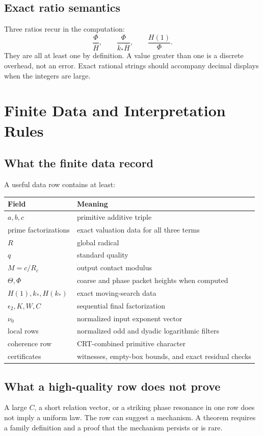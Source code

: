 \section{Exact ratio semantics}
Three ratios recur in the computation:
\[
 \frac{\Phi}{\overline H},
 \qquad
 \frac{\Phi}{k_*\overline H},
 \qquad
 \frac{H(1)}{\Phi}.
\]
They are all at least one by definition. A value greater than one is a discrete overhead, not an error. Exact rational strings should accompany decimal displays when the integers are large.

\chapter{Finite Data and Interpretation Rules}

\section{What the finite data record}
A useful data row contains at least:

\begin{longtable}{p{}p{}}
\toprule
Field & Meaning\\
\midrule
$a,b,c$ & primitive additive triple\\
prime factorizations & exact valuation data for all three terms\\
$R$ & global radical\\
$q$ & standard quality\\
$M=c/R_c$ & output contact modulus\\
$\Theta,\Phi$ & coarse and phase packet heights when computed\\
$H(1),k_*,H(k_*)$ & exact moving-search data\\
$\epsilon_2,K,W,C$ & sequential final factorization\\
$\nu_0$ & normalized input exponent vector\\
local rows & normalized odd and dyadic logarithmic filters\\
coherence row & CRT-combined primitive character\\
certificates & witnesses, empty-box bounds, and exact residual checks\\
\bottomrule
\end{longtable}

\section{What a high-quality row does not prove}
A large $C$, a short relation vector, or a striking phase resonance in one row does not imply a uniform law. The row can suggest a mechanism. A theorem requires a family definition and a proof that the mechanism persists or is rare.

